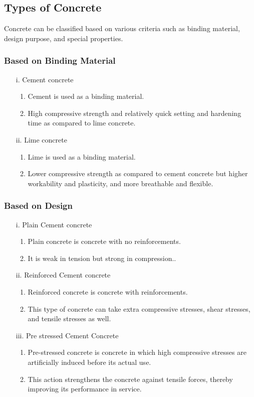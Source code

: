 \documentclass[a4paper,11pt]{book}
\begin{document}
\subsection{Types of Concrete}
Concrete can be classified based on various criteria such as binding material, design purpose, and
special properties.
\subsubsection{Based on Binding Material}
\begin{enumerate}
    \item[i.] Cement concrete
    \begin{enumerate}
            \item Cement is used as a binding material.
            \item High compressive strength and relatively quick setting and
hardening time as compared to lime concrete.
        \end{enumerate}
    \item[ii.] Lime concrete
    \begin{enumerate}
            \item Lime is used as a binding material.
            \item Lower compressive strength as compared to cement concrete but
higher workability and plasticity, and more breathable and flexible.
        \end{enumerate}
\end{enumerate}
\subsubsection{Based on Design}
\begin{enumerate}
    \item[i.] Plain Cement concrete
    \begin{enumerate}
            \item Plain concrete is concrete with no reinforcements.
            \item It is weak in tension but strong in compression..
        \end{enumerate}
    \item[ii.] Reinforced Cement concrete
    \begin{enumerate}
            \item Reinforced concrete is concrete with reinforcements.
            \item This type of concrete can take extra compressive stresses, shear stresses, and tensile stresses as well.
        \end{enumerate}
    \item[iii.]  Pre stressed Cement Concrete
    \begin{enumerate}
            \item Pre-stressed concrete is concrete in which high compressive stresses are artificially induced before its actual use.
            \item This action strengthens the concrete against tensile forces, thereby improving its performance in service.
        \end{enumerate}
\end{enumerate}
\end{document}
